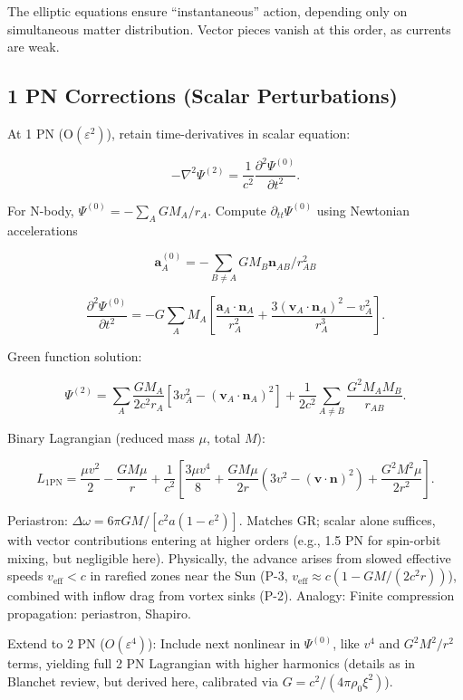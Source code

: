 \documentclass{article}
\begin{document}
The elliptic equations ensure ``instantaneous'' action, depending only on simultaneous matter distribution. Vector pieces vanish at this order, as currents are weak.

\subsection{1 PN Corrections (Scalar Perturbations)}

At 1 PN (O$(\varepsilon^2)$), retain time-derivatives in scalar equation:

\[
- \nabla^2 \Psi^{(2)} = \frac{1}{c^2} \frac{\partial^2 \Psi^{(0)}}{\partial t^2}.
\]

For N-body, $\Psi^{(0)} = - \sum_A GM_A / r_A$. Compute $\partial_{tt} \Psi^{(0)}$ using Newtonian accelerations

\[
\mathbf{a}_A^{(0)} = - \sum_{B \neq A} GM_B \mathbf{n}_{AB} / r_{AB}^2
\]

\[
\frac{\partial^2 \Psi^{(0)}}{\partial t^2} = - G \sum_A M_A \left[ \frac{\mathbf{a}_A \cdot \mathbf{n}_A}{r_A^2} + \frac{3 (\mathbf{v}_A \cdot \mathbf{n}_A)^2 - v_A^2}{r_A^3} \right].
\]

Green function solution:

\[
\Psi^{(2)} = \sum_A \frac{GM_A}{2 c^2 r_A} [3 v_A^2 - (\mathbf{v}_A \cdot \mathbf{n}_A)^2] + \frac{1}{2 c^2} \sum_{A \neq B} \frac{G^2 M_A M_B}{ r_{AB}}.
\]

Binary Lagrangian (reduced mass $\mu$, total $M$):

\[
L_{1\text{PN}} = \frac{\mu v^2}{2} - \frac{GM \mu}{r} + \frac{1}{c^2} \left[ \frac{3\mu v^4}{8} + \frac{GM \mu}{2 r} (3 v^2 - (\mathbf{v} \cdot \mathbf{n})^2) + \frac{G^2 M^2 \mu}{2 r^2} \right].
\]

Periastron: $\Delta \omega = 6\pi GM / [c^2 a (1-e^2)]$. Matches GR; scalar alone suffices, with vector contributions entering at higher orders (e.g., 1.5 PN for spin-orbit mixing, but negligible here). Physically, the advance arises from slowed effective speeds $v_{\text{eff}} < c$ in rarefied zones near the Sun (P-3, $v_{\text{eff}} \approx c (1 - GM/(2 c^2 r))$), combined with inflow drag from vortex sinks (P-2). Analogy: Finite compression propagation: periastron, Shapiro.

Extend to 2 PN ($O(\varepsilon^4)$): Include next nonlinear in $\Psi^{(0)}$, like $v^4$ and $G^2 M^2 / r^2$ terms, yielding full 2 PN Lagrangian with higher harmonics (details as in Blanchet review, but derived here, calibrated via $G = c^2 / (4\pi \rho_0 \xi^2)$).
\end{document}
